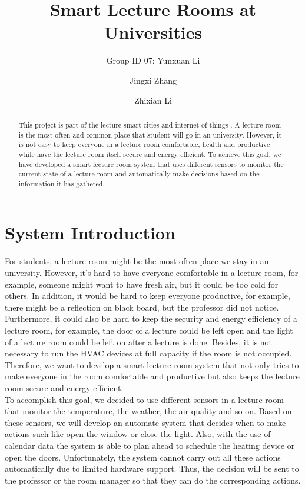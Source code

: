 \documentclass[runningheads]{llncs}
\begin{document}
%
\title{Smart Lecture Rooms at Universities}

\author{Group ID 07: Yunxuan Li \and
Jingxi Zhang \and
Zhixian Li}

%
\maketitle              %
%
\begin{abstract}
This project is part of the lecture smart cities and internet of things \cite{ref_url1}. A lecture room is the most often and common place that student will go in an university. However, it is not easy to keep everyone in a lecture room comfortable, health and productive while have the lecture room itself secure and energy efficient. To achieve this goal, we have developed a smart lecture room system that uses different sensors to monitor the current state of a lecture room and automatically make decisions based on the information it has gathered.

\end{abstract}
%
%
%
\section{System Introduction}
\label{sec:intro}
For students, a lecture room might be the most often place we stay in an university. However, it’s hard to have everyone comfortable in a lecture room, for example, someone might want to have fresh air, but it could be too cold for others. In addition, it would be hard to keep everyone productive, for example, there might be a reflection on black board, but the professor did not notice. Furthermore, it could also be hard to keep the security and energy efficiency of a lecture room, for example, the door of a lecture could be left open and the light of a lecture room could be left on after a lecture is done. Besides, it is not necessary to run the HVAC devices at full capacity if the room is not occupied. Therefore, we want to develop a smart lecture room system that not only tries to make everyone in the room comfortable and productive but also keeps the lecture room secure and energy efficient. \\
To accomplish this goal, we decided to use different sensors in a lecture room that monitor the temperature, the weather, the air quality and so on. Based on these sensors, we will develop an automate system that decides when to make actions such like open the window or close the light. Also, with the use of calendar data the system is able to plan ahead to schedule the heating device or open the doors. Unfortunately, the system cannot carry out all these actions automatically due to limited hardware support. Thus, the decision will be sent to the professor or the room manager so that they can do the corresponding actions.
\end{document}
